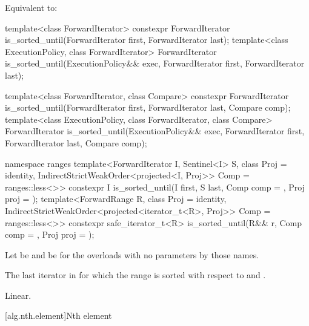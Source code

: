 \begin{itemdescr}
\pnum
\effects Equivalent to:
\end{itemdescr}

%
\begin{itemdecl}
template<class ForwardIterator>
  constexpr ForwardIterator
    is_sorted_until(ForwardIterator first, ForwardIterator last);
template<class ExecutionPolicy, class ForwardIterator>
  ForwardIterator
    is_sorted_until(ExecutionPolicy&& exec,
                    ForwardIterator first, ForwardIterator last);

template<class ForwardIterator, class Compare>
  constexpr ForwardIterator
    is_sorted_until(ForwardIterator first, ForwardIterator last,
                    Compare comp);
template<class ExecutionPolicy, class ForwardIterator, class Compare>
  ForwardIterator
    is_sorted_until(ExecutionPolicy&& exec,
                    ForwardIterator first, ForwardIterator last,
                    Compare comp);

namespace ranges {
  template<ForwardIterator I, Sentinel<I> S, class Proj = identity,
      IndirectStrictWeakOrder<projected<I, Proj>> Comp = ranges::less<>>
    constexpr I is_sorted_until(I first, S last, Comp comp = {}, Proj proj = {});
  template<ForwardRange R, class Proj = identity,
      IndirectStrictWeakOrder<projected<iterator_t<R>, Proj>> Comp = ranges::less<>>
    constexpr safe_iterator_t<R>
      is_sorted_until(R&& r, Comp comp = {}, Proj proj = {});
}
\end{itemdecl}

\begin{itemdescr}
\pnum
Let  be 
and  be 
for the overloads with no parameters by those names.

\pnum
\returns
The last iterator  in  for which the
range  is sorted with respect to  and .

\pnum
\complexity Linear.
\end{itemdescr}

[alg.nth.element]{Nth element}


